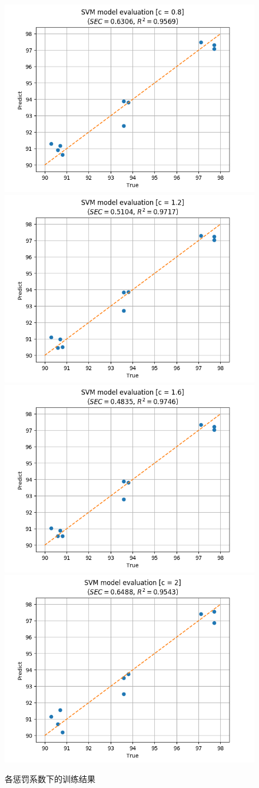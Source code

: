 \documentclass[a4paper]{article}
\begin{document}
			
			\begin{figure}
				\begin{minipage}{\linewidth}
					\includegraphics[width=0.5\linewidth]{../img/svm_result_t3_c0_8}
					\includegraphics[width=0.5\linewidth]{../img/svm_result_t3_c1_2}
					\includegraphics[width=0.5\linewidth]{../img/svm_result_t3_c1_6}
					\includegraphics[width=0.5\linewidth]{../img/svm_result_t3_c2}
				\end{minipage}
				\caption{各惩罚系数下的训练结果}
				\label{fig:svm_result_c}
			\end{figure}
			
\end{document}
